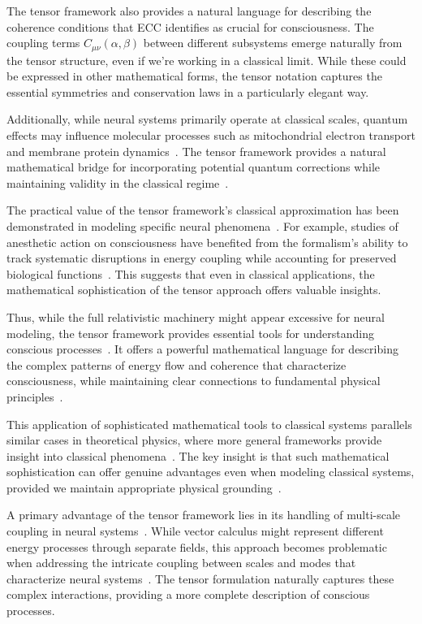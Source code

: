 The tensor framework also provides a natural language for describing the coherence conditions that ECC identifies as crucial for consciousness. The coupling terms $C_{\mu\nu}(\alpha, \beta)$ between different subsystems emerge naturally from the tensor structure, even if we're working in a classical limit. While these could be expressed in other mathematical forms, the tensor notation captures the essential symmetries and conservation laws in a particularly elegant way.

Additionally, while neural systems primarily operate at classical scales, quantum effects may influence molecular processes such as mitochondrial electron transport and membrane protein dynamics~\cite{penrose2016fashion, koch2019feeling}. The tensor framework provides a natural mathematical bridge for incorporating potential quantum corrections while maintaining validity in the classical regime~\cite{rosen2012anticipatory, bateson2002mind}.

The practical value of the tensor framework's classical approximation has been demonstrated in modeling specific neural phenomena~\cite{thompson2014waking}. For example, studies of anesthetic action on consciousness have benefited from the formalism's ability to track systematic disruptions in energy coupling while accounting for preserved biological functions~\cite{feinberg2016ancient}. This suggests that even in classical applications, the mathematical sophistication of the tensor approach offers valuable insights.

Thus, while the full relativistic machinery might appear excessive for neural modeling, the tensor framework provides essential tools for understanding conscious processes~\cite{varela2016embodied}. It offers a powerful mathematical language for describing the complex patterns of energy flow and coherence that characterize consciousness, while maintaining clear connections to fundamental physical principles~\cite{rovelli2018order}.

This application of sophisticated mathematical tools to classical systems parallels similar cases in theoretical physics, where more general frameworks provide insight into classical phenomena~\cite{kelso2016dynamic}. The key insight is that such mathematical sophistication can offer genuine advantages even when modeling classical systems, provided we maintain appropriate physical grounding~\cite{chalmers2010character}.

A primary advantage of the tensor framework lies in its handling of multi-scale coupling in neural systems~\cite{deacon2013incomplete}. While vector calculus might represent different energy processes through separate fields, this approach becomes problematic when addressing the intricate coupling between scales and modes that characterize neural systems~\cite{thompson2014waking}. The tensor formulation naturally captures these complex interactions, providing a more complete description of conscious processes.

